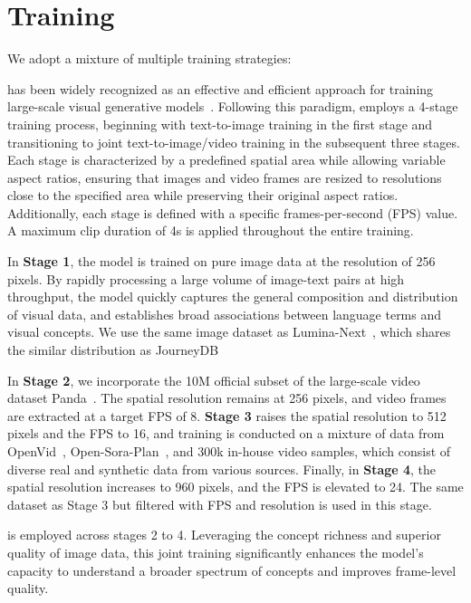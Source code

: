 \section{Training}
\label{sec:Training}
We adopt a mixture of multiple training strategies:

\textbf{} has been widely recognized as an effective and efficient approach for training large-scale visual generative models~\citep{luminamgpt, luminat2x, CogVideoX, open-sora-plan, MovieGen}. Following this paradigm, \sysname{} employs a 4-stage training process, beginning with text-to-image training in the first stage and transitioning to joint text-to-image/video training in the subsequent three stages. Each stage is characterized by a predefined spatial area while allowing variable aspect ratios, ensuring that images and video frames are resized to resolutions close to the specified area while preserving their original aspect ratios. Additionally, each stage is defined with a specific frames-per-second (FPS) value. A maximum clip duration of 4s is applied throughout the entire training.

In \textbf{Stage 1}, the model is trained on pure image data at the resolution of 256 pixels. By rapidly processing a large volume of image-text pairs at high throughput, the model quickly captures the general composition and distribution of visual data, and establishes broad associations between language terms and visual concepts. We use the same image dataset as Lumina-Next~\citep{luminanext}, which shares the similar distribution as JourneyDB~\citep{sun2024journeydb}

In \textbf{Stage 2}, we incorporate the 10M official subset of the large-scale video dataset Panda~\citep{panda}. The spatial resolution remains at 256 pixels, and video frames are extracted at a target FPS of 8. \textbf{Stage 3} raises the spatial resolution to 512 pixels and the FPS to 16, and training is conducted on a mixture of data from OpenVid~\citep{openvid}, Open-Sora-Plan~\citep{open-sora-plan}, and 300k in-house video samples, which consist of diverse real and synthetic data from various sources. Finally, in \textbf{Stage 4}, the spatial resolution increases to 960 pixels, and the FPS is elevated to 24. The same dataset as Stage 3 but filtered with FPS and resolution is used in this stage.

\textbf{} is employed across stages 2 to 4. Leveraging the concept richness and superior quality of image data, this joint training significantly enhances the model’s capacity to understand a broader spectrum of concepts and improves frame-level quality.

